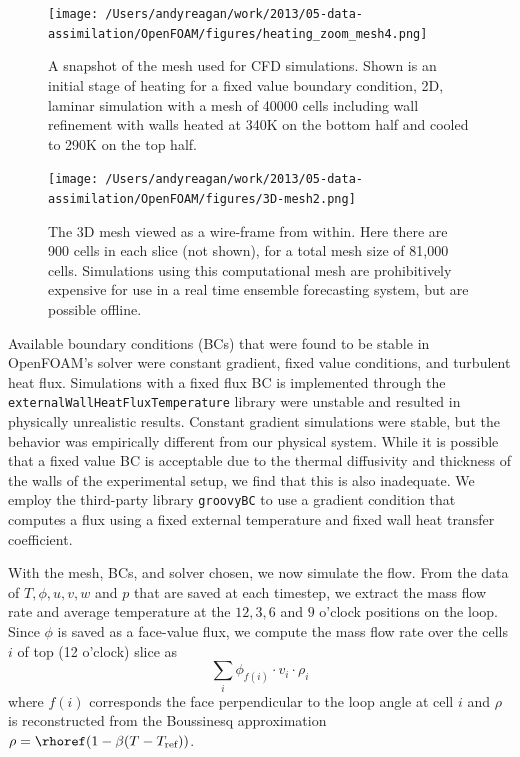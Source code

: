 \begin{figure}[t]
  \centering
  \texttt{[image: /Users/andyreagan/work/2013/05-data-assimilation/OpenFOAM/figures/heating\_zoom\_mesh4.png]}
  \caption[A snapshot of the mesh used for CFD simulations]{
  A snapshot of the mesh used for CFD simulations.
  Shown is an initial stage of heating for a fixed value boundary condition, 2D, laminar simulation with a mesh of 40000 cells including wall refinement with walls heated at 340K on the bottom half and cooled to 290K on the top half.
  }
  \label{fig:CFDmesh1}
\end{figure}

\begin{figure}[t]
  \centering
  \texttt{[image: /Users/andyreagan/work/2013/05-data-assimilation/OpenFOAM/figures/3D-mesh2.png]}
  \caption[The 3D mesh viewed as a wire-frame from within]{
  The 3D mesh viewed as a wire-frame from within.
  Here there are 900 cells in each slice (not shown), for a total mesh size of 81,000 cells.
  Simulations using this computational mesh are prohibitively expensive for use in a real time ensemble forecasting system, but are possible offline.
  }
  \label{fig:CFDmesh2}
\end{figure}

Available boundary conditions (BCs) that were found to be stable in OpenFOAM's solver were constant gradient, fixed value conditions, and turbulent heat flux.
Simulations with a fixed flux BC is implemented through the \verb|externalWallHeatFluxTemperature| library were unstable and resulted in physically unrealistic results.
Constant gradient simulations were stable, but the behavior was empirically different from our physical system.
While it is possible that a fixed value BC is acceptable due to the thermal diffusivity and thickness of the walls of the experimental setup, we find that this is also inadequate.
We employ the third-party library \verb|groovyBC| to use a gradient condition that computes a flux using a fixed external temperature and fixed wall heat transfer coefficient.

With the mesh, BCs, and solver chosen, we now simulate the flow.
From the data of $T,\phi,u,v,w$ and $p$ that are saved at each timestep, we extract the mass flow rate and average temperature at the $12,3,6$ and $9$ o'clock positions on the loop.
Since $\phi$ is saved as a face-value flux, we compute the mass flow rate over the cells $i$ of top (12 o'clock) slice as
\begin{equation} \sum _i\phi_{f(i)} \cdot v_i \cdot \rho_i\end{equation}
where $f(i)$ corresponds the face perpendicular to the loop angle at cell $i$ and $\rho$ is reconstructed from the Boussinesq approximation $\rho = \rhoref (1-\beta(T-T_\text{ref}))$.

